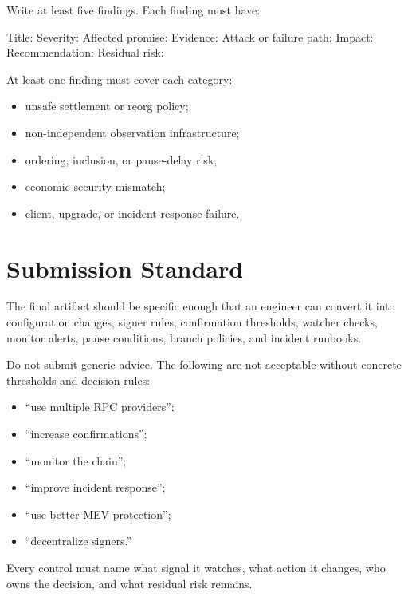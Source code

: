 Write at least five findings. Each finding must have:

\begin{codeblock}
Title:
Severity:
Affected promise:
Evidence:
Attack or failure path:
Impact:
Recommendation:
Residual risk:
\end{codeblock}

At least one finding must cover each category:

\begin{itemize}
\item unsafe settlement or reorg policy;
\item non-independent observation infrastructure;
\item ordering, inclusion, or pause-delay risk;
\item economic-security mismatch;
\item client, upgrade, or incident-response failure.
\end{itemize}

\section*{Submission Standard}

The final artifact should be specific enough that an engineer can convert it into configuration changes, signer rules, confirmation thresholds, watcher checks, monitor alerts, pause conditions, branch policies, and incident runbooks.

Do not submit generic advice. The following are not acceptable without concrete thresholds and decision rules:

\begin{itemize}
\item ``use multiple RPC providers'';
\item ``increase confirmations'';
\item ``monitor the chain'';
\item ``improve incident response'';
\item ``use better MEV protection'';
\item ``decentralize signers.''
\end{itemize}

Every control must name what signal it watches, what action it changes, who owns the decision, and what residual risk remains.
